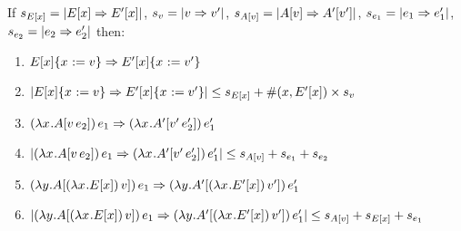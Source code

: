 \documentclass{article}
\begin{document}
\begin{lemma}[Size]
\label{lem:size}
If $s_{\Ex} = \size{\Ex \pstep \Ex[']}$, $s_\val = \size{\val \pstep \val'}$,
$s_{\Av} = \size{\Av \pstep \inA[']{\val'}}$, $s_{\e_1} = \size{\e_1 \pstep
  \e_1'}$, $s_{\e_2} = \size{\e_2 \pstep \e_2'}$ 
then:
\begin{enumerate}
\item $\substx{\Ex}{\val} \pstep \substx{\Ex[']}{\val'}$
\item $\size{\substx{\Ex}{\val} \pstep \substx{\Ex[']}{\val'}} 
         \leq 
       s_{\Ex} + \numfvx{\Ex[']} \times s_\val$
\item $\app{\lx{\inA{\ap{\val}{\e_2}}}}{\e_1} 
        \pstep 
       \app{\lx{\inA[']{\ap{\val'}{\e_2'}}}}{\e_1'}$
\item $\size{\app{\lx{\inA{\ap{\val}{\e_2}}}}{\e_1} 
               \pstep 
             \app{\lx{\inA[']{\ap{\val'}{\e_2'}}}}{\e_1'}}
         \leq
         s_{\Av} + s_{\e_1} + s_{\e_2}$
\item $\app{\ly{\inA{\app{\lxEx}{\val}}}}{\e_1}
         \pstep
       \app{\ly{\inA[']{\app{\lxEx[']}{\val'}}}}{\e_1'}$
\item $\size{\app{\ly{\inA{\app{\lxEx}{\val}}}}{\e_1}
              \pstep
            \app{\ly{\inA[']{\app{\lxEx[']}{\val'}}}}{\e_1'}}
       \leq
       s_{\Av} + s_{\Ex} + s_{\e_1}$
\end{enumerate}
\end{lemma}
\end{document}
